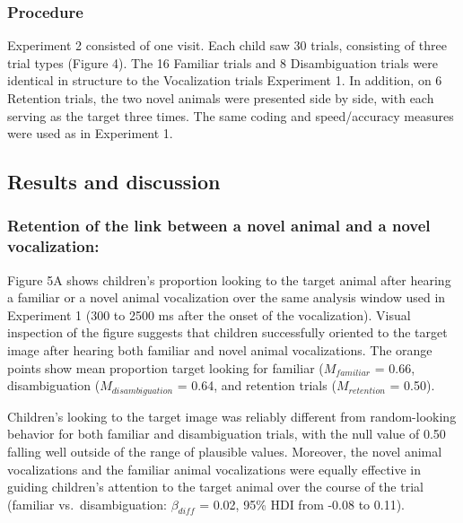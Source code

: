 \documentclass[english,floatsintext,man]{apa6}
\theoremstyle{definition}
\theoremstyle{definition}
\theoremstyle{definition}
\theoremstyle{remark}
\begin{document}
\hypertarget{procedure-1}{%
\subsubsection{Procedure}\label{procedure-1}}

Experiment 2 consisted of one visit. Each child saw 30 trials,
consisting of three trial types (Figure 4). The 16 Familiar trials and 8
Disambiguation trials were identical in structure to the Vocalization
trials Experiment 1. In addition, on 6 Retention trials, the two novel
animals were presented side by side, with each serving as the target
three times. The same coding and speed/accuracy measures were used as in
Experiment 1.

\hypertarget{results-and-discussion-1}{%
\subsection{Results and discussion}\label{results-and-discussion-1}}

\hypertarget{retention-of-the-link-between-a-novel-animal-and-a-novel-vocalization}{%
\subsubsection{Retention of the link between a novel animal and a novel
vocalization:}\label{retention-of-the-link-between-a-novel-animal-and-a-novel-vocalization}}

Figure 5A shows children's proportion looking to the target animal after
hearing a familiar or a novel animal vocalization over the same analysis
window used in Experiment 1 (300 to 2500 ms after the onset of the
vocalization). Visual inspection of the figure suggests that children
successfully oriented to the target image after hearing both familiar
and novel animal vocalizations. The orange points show mean proportion
target looking for familiar (\(M_{familiar}\) = 0.66, disambiguation
(\(M_{disambiguation}\) = 0.64, and retention trials (\(M_{retention}\)
= 0.50).

Children's looking to the target image was reliably different from
random-looking behavior for both familiar and disambiguation trials,
with the null value of 0.50 falling well outside of the range of
plausible values. Moreover, the novel animal vocalizations and the
familiar animal vocalizations were equally effective in guiding
children's attention to the target animal over the course of the trial
(familiar vs.~disambiguation: \(\beta_{diff}\) = 0.02, 95\% HDI from
-0.08 to 0.11).
\end{document}
